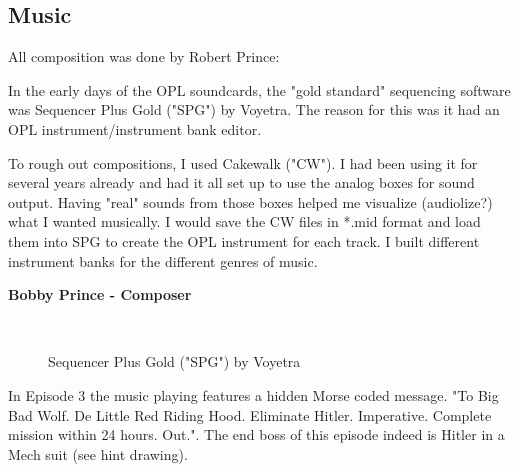 \documentclass[book.tex]{subfiles}
\begin{document}
\subsection{Music}
All composition was done by Robert Prince:\\
\par
 \begin{fancyquotes}
In the early days of the OPL soundcards, the "gold standard" sequencing software was Sequencer Plus Gold ("SPG") by Voyetra. The reason for this was it had an OPL instrument/instrument bank editor.\\
\par
To rough out compositions, I used Cakewalk ("CW"). I had been using it for several years already and had it all set up to use the analog boxes for sound output. Having "real" sounds from those boxes helped me visualize (audiolize?) what I wanted musically. I would save the CW files in *.mid format and load them into SPG to create the OPL instrument for each track. I built different instrument banks for the different genres of music.

\textbf{Bobby Prince - Composer}
 \end{fancyquotes}\\

\begin{figure}[H]
\centering
\caption{Sequencer Plus Gold ("SPG") by Voyetra}
\end{figure}



 In Episode 3 the music playing features a hidden Morse coded message. "To Big Bad Wolf. De Little Red Riding Hood. Eliminate Hitler. Imperative. Complete mission within 24 hours. Out.". The end boss of this episode indeed is Hitler in a Mech suit (see hint drawing).
\end{document}
